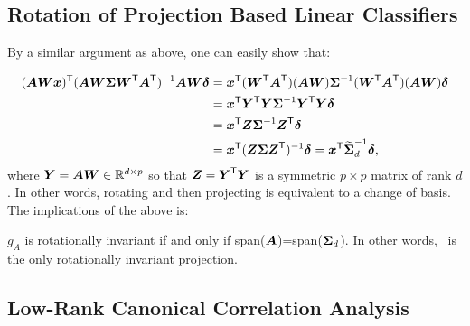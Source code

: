 \documentclass[11pt]{extarticle}
\begin{document}
\subsection{Rotation of Projection Based Linear Classifiers}

By a similar argument as above, one can easily show that:

\begin{align*}
(\bA  \bW \bx) \TT  (\bA \bW  \bSig  \bW\TT \bA\TT)^{-1} \bA \bW \bdel
&= \bx\TT (\bW\TT \bA\TT) (\bA \bW) \bSig^{-1} (\bW\TT \bA\TT) (\bA \bW) \bdel \\
&= \bx\TT \bY\TT \bY \bSig^{-1} \bY\TT \bY \bdel \\
&= \bx\TT \bZ \bSig^{-1} \bZ\TT \bdel \\
&= \bx\TT (\bZ \bSig \bZ\TT)^{-1} \bdel = \bx\TT \mt{\bSig}_d^{-1} \bdel,
\end{align*}
where $\bY = \bA \bW \in \Real^{d \times p}$ so that $\bZ=\bY\TT \bY$ is a symmetric ${p \times p}$ matrix of rank $d$.  In other words, rotating and then projecting is equivalent to a change of basis.
The implications of the above is:
\begin{lem}
$g_A$ is rotationally invariant if and only if span($\bA$)=span($\bSig_d$).
In other words, \Lda~is the only rotationally invariant projection.
\end{lem}


\subsection{Low-Rank Canonical Correlation Analysis}
\label{sec:cca}
\end{document}
